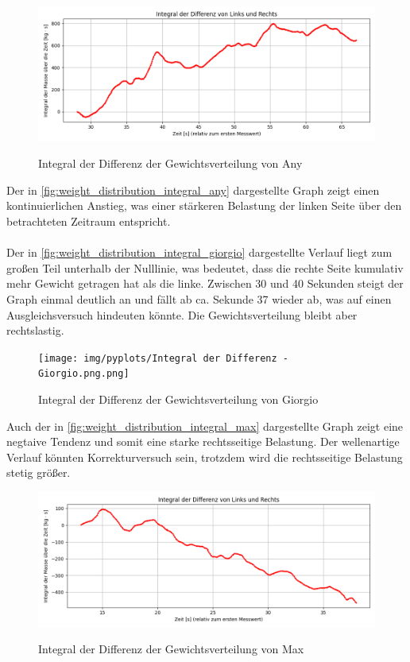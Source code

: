 
\begin{figure}
  \centering
  \includegraphics[width=0.7\linewidth]{img/pyplots/Integral der Differenz - Any.png}\\
  \caption{Integral der Differenz der Gewichtsverteilung von Any}
  \label{fig:weight_distribution_integral_any}
\end{figure}
Der in \autoref{fig:weight_distribution_integral_any} dargestellte Graph zeigt einen kontinuierlichen Anstieg, was einer stärkeren Belastung der linken Seite über den betrachteten Zeitraum entspricht. \\
\\
Der in \autoref{fig:weight_distribution_integral_giorgio} dargestellte Verlauf liegt zum großen Teil unterhalb der Nulllinie, was bedeutet, dass die rechte Seite kumulativ mehr Gewicht getragen hat als die linke. 
Zwischen 30 und 40 Sekunden steigt der Graph einmal deutlich an und fällt ab ca. Sekunde 37 wieder ab, was auf einen Ausgleichsversuch hindeuten könnte. Die Gewichtsverteilung bleibt aber rechtslastig. 
\begin{figure}
  \centering
  \texttt{[image: img/pyplots/Integral der Differenz - Giorgio.png.png]}\\
  \caption{Integral der Differenz der Gewichtsverteilung von Giorgio}
  \label{fig:weight_distribution_integral_giorgio}
\end{figure}
Auch der in \autoref{fig:weight_distribution_integral_max} dargestellte Graph zeigt eine negtaive Tendenz und somit eine starke rechtsseitige Belastung. Der wellenartige Verlauf könnten Korrekturversuch sein, trotzdem wird die rechtsseitige Belastung stetig größer.  
\begin{figure}
  \centering
  \includegraphics[width=0.7\linewidth]{img/pyplots/Integral der Differenz - Max.png}\\
  \caption{Integral der Differenz der Gewichtsverteilung von Max}
  \label{fig:weight_distribution_integral_max}
\end{figure}
